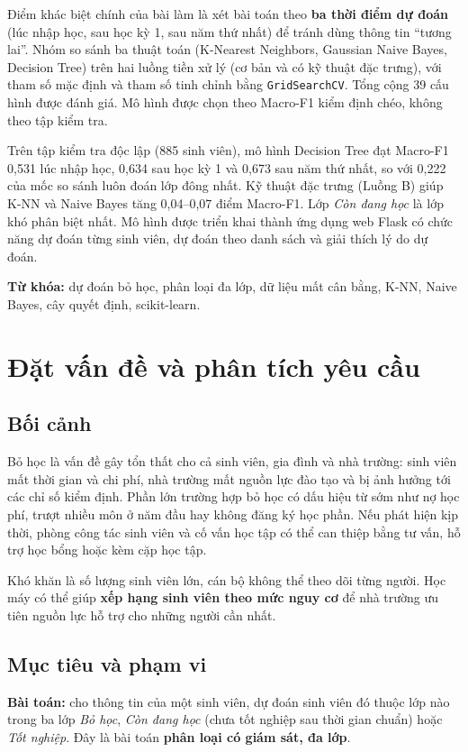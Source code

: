 \documentclass[12pt,a4paper,oneside]{report}
\newcommand{\code}[1]{\texttt{#1}}
\newcommand{\fone}{Macro-F1}
\begin{document}
Điểm khác biệt chính của bài làm là xét bài toán theo \textbf{ba thời điểm dự đoán} (lúc nhập học, sau học kỳ 1, sau năm thứ nhất)
để tránh dùng thông tin ``tương lai''. Nhóm so sánh ba thuật toán (K-Nearest Neighbors, Gaussian Naive Bayes, Decision Tree)
trên hai luồng tiền xử lý (cơ bản và có kỹ thuật đặc trưng), với tham số mặc định và tham số tinh chỉnh bằng \code{GridSearchCV}.
Tổng cộng 39 cấu hình được đánh giá. Mô hình được chọn theo \fone{} kiểm định chéo, không theo tập kiểm tra.

Trên tập kiểm tra độc lập (885 sinh viên), mô hình Decision Tree đạt \fone{} 0,531 lúc nhập học, 0,634 sau học kỳ 1 và
0,673 sau năm thứ nhất, so với 0,222 của mốc so sánh luôn đoán lớp đông nhất. Kỹ thuật đặc trưng (Luồng B) giúp K-NN và
Naive Bayes tăng 0,04--0,07 điểm \fone{}. Lớp \emph{Còn đang học} là lớp khó phân biệt nhất. Mô hình được triển khai thành
ứng dụng web Flask có chức năng dự đoán từng sinh viên, dự đoán theo danh sách và giải thích lý do dự đoán.

\textbf{Từ khóa:} dự đoán bỏ học, phân loại đa lớp, dữ liệu mất cân bằng, K-NN, Naive Bayes, cây quyết định, scikit-learn.

\tableofcontents
\listoffigures
\listoftables
\clearpage

\chapter{Đặt vấn đề và phân tích yêu cầu}
\section{Bối cảnh}
Bỏ học là vấn đề gây tổn thất cho cả sinh viên, gia đình và nhà trường: sinh viên mất thời gian và chi phí,
nhà trường mất nguồn lực đào tạo và bị ảnh hưởng tới các chỉ số kiểm định. Phần lớn trường hợp bỏ học có dấu hiệu từ sớm
như nợ học phí, trượt nhiều môn ở năm đầu hay không đăng ký học phần. Nếu phát hiện kịp thời, phòng công tác sinh viên và
cố vấn học tập có thể can thiệp bằng tư vấn, hỗ trợ học bổng hoặc kèm cặp học tập.

Khó khăn là số lượng sinh viên lớn, cán bộ không thể theo dõi từng người. Học máy có thể giúp \textbf{xếp hạng sinh viên theo
mức nguy cơ} để nhà trường ưu tiên nguồn lực hỗ trợ cho những người cần nhất.

\section{Mục tiêu và phạm vi}
\textbf{Bài toán:} cho thông tin của một sinh viên, dự đoán sinh viên đó thuộc lớp nào trong ba lớp
\emph{Bỏ học}, \emph{Còn đang học} (chưa tốt nghiệp sau thời gian chuẩn) hoặc \emph{Tốt nghiệp}.
Đây là bài toán \textbf{phân loại có giám sát, đa lớp}.
\end{document}
